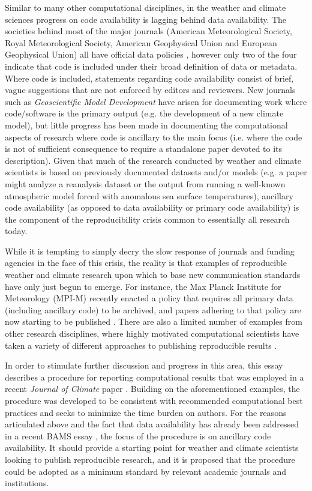 Similar to many other computational disciplines, in the weather and climate sciences progress on code availability is lagging behind data availability. The societies behind most of the major journals (American Meteorological Society, Royal Meteorological Society, American Geophysical Union and European Geophysical Union) all have official data policies \citep[e.g.][]{Mayernik2015}, however only two of the four indicate that code is included under their broad definition of data or metadata. Where code is included, statements regarding code availability consist of brief, vague suggestions that are not enforced by editors and reviewers. New journals such as \textit{Geoscientific Model Development} have arisen for documenting work where code/software is the primary output (e.g. the development of a new climate model), but little progress has been made in documenting the computational aspects of research where code is ancillary to the main focus (i.e. where the code is not of sufficient consequence to require a standalone paper devoted to its description). Given that much of the research conducted by weather and climate scientists is based on previously documented datasets and/or models (e.g. a paper might analyze a reanalysis dataset or the output from running a well-known atmospheric model forced with anomalous sea surface temperatures), ancillary code availability (as opposed to data availability or primary code availability) is the component of the reproducibility crisis common to essentially all research today.

While it is tempting to simply decry the slow response of journals and funding agencies in the face of this crisis, the reality is that examples of reproducible weather and climate research upon which to base new communication standards have only just begun to emerge. For instance, the Max Planck Institute for Meteorology (MPI-M) recently enacted a policy \citep{Stevens2015a} that requires all primary data (including ancillary code) to be archived, and papers adhering to that policy are now starting to be published \citep[e.g.][]{Stevens2015}. There are also a limited number of examples from other research disciplines, where highly motivated computational scientists have taken a variety of different approaches to publishing reproducible results \citep[e.g.][]{Ketcheson2012,Crooks2014,Bremges2015,Schmitt2015}. 

In order to stimulate further discussion and progress in this area, this essay describes a procedure for reporting computational results that was employed in a recent \textit{Journal of Climate} paper \citep[][hereafter referred to as IS2015]{IrvingSimmonds2015}. Building on the aforementioned examples, the procedure was developed to be consistent with recommended computational best practices and seeks to minimize the time burden on authors. For the reasons articulated above and the fact that data availability has already been addressed in a recent BAMS essay \citep{Mayernik2015a}, the focus of the procedure is on ancillary code availability. It should provide a starting point for weather and climate scientists looking to publish reproducible research, and it is proposed that the procedure could be adopted as a minimum standard by relevant academic journals and institutions.

  
  
  
  
  
  
  
  
  
  
  
  